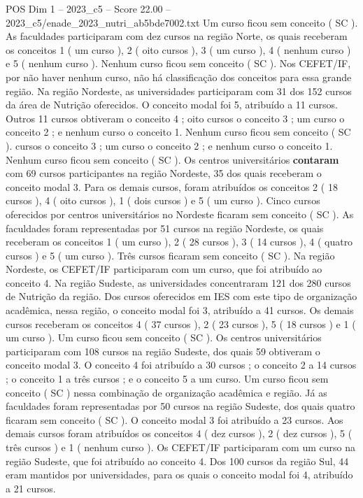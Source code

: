 \begin{textsample}{POS Dim 1 – 2023\_c5 – Score 22.00 – 2023\_c5/enade\_2023\_nutri\_ab5bde7002.txt}
Um curso ficou sem conceito ( SC ).
As faculdades participaram com dez cursos na região Norte, os quais receberam os conceitos 1 ( um curso ), 2 ( oito cursos ), 3 ( um curso ), 4 ( nenhum curso ) e 5 ( nenhum curso ).
Nenhum curso ficou sem conceito ( SC ).
Nos CEFET/IF, por não haver nenhum curso, não há classificação dos conceitos para essa grande região.
Na região Nordeste, as universidades participaram com 31 dos 152 cursos da área de Nutrição oferecidos.
O conceito modal foi 5, atribuído a 11 cursos.
Outros 11 cursos obtiveram o conceito 4 ; oito cursos o conceito 3 ; um curso o conceito 2 ; e nenhum curso o conceito 1.
Nenhum curso ficou sem conceito ( SC ). cursos o conceito 3 ; um curso o conceito 2 ; e nenhum curso o conceito 1.
Nenhum curso ficou sem conceito ( SC ).
Os centros universitários \textbf{contaram} com 69 cursos participantes na região Nordeste, 35 dos quais receberam o conceito modal 3.
Para os demais cursos, foram atribuídos os conceitos 2 ( 18 cursos ), 4 ( oito cursos ), 1 ( dois cursos ) e 5 ( um curso ).
Cinco cursos oferecidos por centros universitários no Nordeste ficaram sem conceito ( SC ).
As faculdades foram representadas por 51 cursos na região Nordeste, os quais receberam os conceitos 1 ( um curso ), 2 ( 28 cursos ), 3 ( 14 cursos ), 4 ( quatro cursos ) e 5 ( um curso ).
Três cursos ficaram sem conceito ( SC ).
Na região Nordeste, os CEFET/IF participaram com um curso, que foi atribuído ao conceito 4.
Na região Sudeste, as universidades concentraram 121 dos 280 cursos de Nutrição da região.
Dos cursos oferecidos em IES com este tipo de organização acadêmica, nessa região, o conceito modal foi 3, atribuído a 41 cursos.
Os demais cursos receberam os conceitos 4 ( 37 cursos ), 2 ( 23 cursos ), 5 ( 18 cursos ) e 1 ( um curso ).
Um curso ficou sem conceito ( SC ).
Os centros universitários participaram com 108 cursos na região Sudeste, dos quais 59 obtiveram o conceito modal 3.
O conceito 4 foi atribuído a 30 cursos ; o conceito 2 a 14 cursos ; o conceito 1 a três cursos ; e o conceito 5 a um curso.
Um curso ficou sem conceito ( SC ) nessa combinação de organização acadêmica e região.
Já as faculdades foram representadas por 50 cursos na região Sudeste, dos quais quatro ficaram sem conceito ( SC ).
O conceito modal 3 foi atribuído a 23 cursos.
Aos demais cursos foram atribuídos os conceitos 4 ( dez cursos ), 2 ( dez cursos ), 5 ( três cursos ) e 1 ( nenhum curso ).
Os CEFET/IF participaram com um curso na região Sudeste, que foi atribuído ao conceito 4.
Dos 100 cursos da região Sul, 44 eram mantidos por universidades, para os quais o conceito modal foi 4, atribuído a 21 cursos.

\end{textsample}
